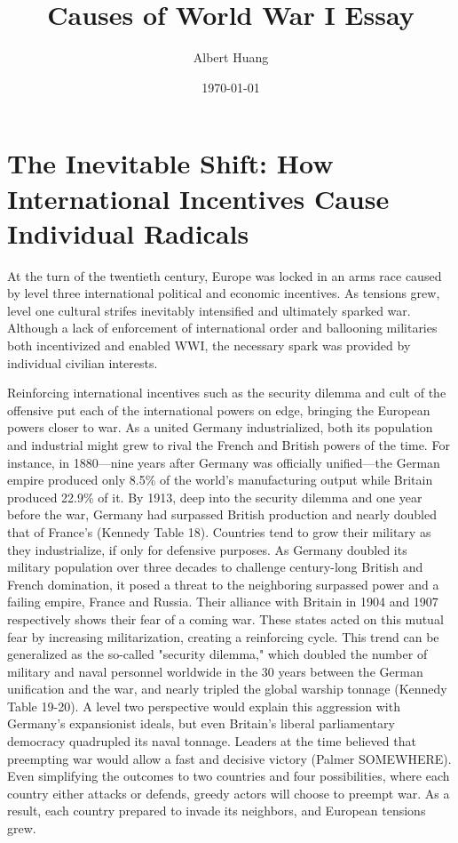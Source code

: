 \documentclass[11pt]{article}
\author{Albert Huang}
\date{\today}
\title{Causes of World War I Essay}
\begin{document}
\maketitle
\tableofcontents


\section{The Inevitable Shift: How International Incentives Cause Individual Radicals}
\label{sec:org2f02194}

\setlength\parindent{0.5in}

  \begin{doublespacing}

          At the turn of the twentieth century, Europe was locked in an arms race caused by level three international political and economic incentives. As tensions grew, level one cultural strifes inevitably intensified and ultimately sparked war.
 Although a lack of enforcement of international order and ballooning militaries both incentivized and enabled WWI, the necessary spark was provided by individual civilian interests.

 Reinforcing international incentives such as the security dilemma and cult of the offensive put each of the international powers on edge, bringing the European powers closer to war.
 As a united Germany industrialized, both its population and industrial might grew to rival the French and British powers of the time. For instance, in 1880—nine years after Germany was officially unified—the German empire produced only 8.5\% of the world's manufacturing output while Britain produced 22.9\% of it. By 1913, deep into the security dilemma and one year before the war, Germany had surpassed British production and nearly doubled that of France's (Kennedy Table 18).
 Countries tend to grow their military as they industrialize, if only for defensive purposes. As Germany doubled its military population over three decades to challenge century-long British and French domination, it posed a threat to the neighboring surpassed power and a failing empire, France and Russia. Their alliance with Britain in 1904 and 1907 respectively shows their fear of a coming war. These states acted on this mutual fear by increasing militarization, creating a reinforcing cycle.
  This trend can be generalized as the so-called "security dilemma," which doubled the number of military and naval personnel worldwide in the 30 years between the German unification and the war, and nearly tripled the global warship tonnage (Kennedy Table 19-20). A level two perspective would explain this aggression with Germany's expansionist ideals, but even Britain's liberal parliamentary democracy quadrupled its naval tonnage.
  Leaders at the time believed that preempting war would allow a fast and decisive victory (Palmer SOMEWHERE). Even simplifying the outcomes to two countries and four possibilities, where each country either attacks or defends, greedy actors will choose to preempt war. As a result, each country prepared to invade its neighbors, and European tensions grew.

\end{doublespacing}
\end{document}
